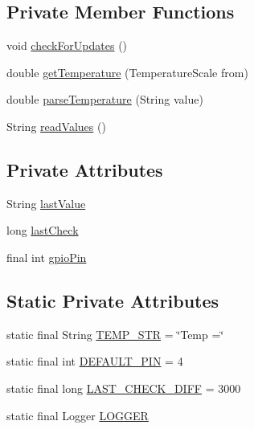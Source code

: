 \subsection*{Private Member Functions}
\begin{DoxyCompactItemize}
\item 
void \hyperlink{classcom_1_1libsensorj_1_1concretesensor_1_1DHT11Temperature_a0ed494577e6a3c68dc737b60f926269d}{check\+For\+Updates} ()
\item 
double \hyperlink{classcom_1_1libsensorj_1_1concretesensor_1_1DHT11Temperature_abb836186013ae429e2cfde981154969b}{get\+Temperature} (Temperature\+Scale from)
\item 
double \hyperlink{classcom_1_1libsensorj_1_1concretesensor_1_1DHT11Temperature_a061220e6439c2014ab81384738c07734}{parse\+Temperature} (String value)
\item 
String \hyperlink{classcom_1_1libsensorj_1_1concretesensor_1_1DHT11Temperature_a2e5125c490d1b7b28a359cf702334fd7}{read\+Values} ()
\end{DoxyCompactItemize}
\subsection*{Private Attributes}
\begin{DoxyCompactItemize}
\item 
String \hyperlink{classcom_1_1libsensorj_1_1concretesensor_1_1DHT11Temperature_af16dd6a4c88dedacb8a4d69d90eff670}{last\+Value}
\item 
long \hyperlink{classcom_1_1libsensorj_1_1concretesensor_1_1DHT11Temperature_a00ec2e3e31bcaf04f497d5c503a84c5e}{last\+Check}
\item 
final int \hyperlink{classcom_1_1libsensorj_1_1concretesensor_1_1DHT11Temperature_a312572f2f0bad8b41d171481ef4e3138}{gpio\+Pin}
\end{DoxyCompactItemize}
\subsection*{Static Private Attributes}
\begin{DoxyCompactItemize}
\item 
static final String \hyperlink{classcom_1_1libsensorj_1_1concretesensor_1_1DHT11Temperature_a123ae6845e0cc1d1ec859cf7cfb78004}{T\+E\+M\+P\+\_\+\+S\+T\+R} = \char`\"{}Temp =\char`\"{}
\item 
static final int \hyperlink{classcom_1_1libsensorj_1_1concretesensor_1_1DHT11Temperature_af8bf5091500d4dcb3b5a0663279359e2}{D\+E\+F\+A\+U\+L\+T\+\_\+\+P\+I\+N} = 4
\item 
static final long \hyperlink{classcom_1_1libsensorj_1_1concretesensor_1_1DHT11Temperature_a7a5b6b6685407c05809a7e4c97358dd4}{L\+A\+S\+T\+\_\+\+C\+H\+E\+C\+K\+\_\+\+D\+I\+F\+F} = 3000
\item 
static final Logger \hyperlink{classcom_1_1libsensorj_1_1concretesensor_1_1DHT11Temperature_a96d485fc09496c1b5a320a30bb3400c9}{L\+O\+G\+G\+E\+R}
\end{DoxyCompactItemize}


